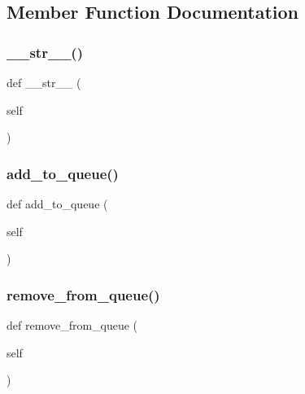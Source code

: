 \subsection{Member Function Documentation}
\mbox{\label{classdynamicfilterapp_1_1models_1_1_item_a23e8041ce1015febe4fdace3225714f9}} 
\subsubsection{\texorpdfstring{\_\_str\_\_()}{\_\_str\_\_()}}
{\footnotesize\ttfamily def \+\_\+\+\_\+str\+\_\+\+\_\+ (\begin{DoxyParamCaption}\item[{}]{self }\end{DoxyParamCaption})}

\mbox{\label{classdynamicfilterapp_1_1models_1_1_item_ac83cd255885b9a7b8852cd66fad6da53}} 
\subsubsection{\texorpdfstring{add\_to\_queue()}{add\_to\_queue()}}
{\footnotesize\ttfamily def add\+\_\+to\+\_\+queue (\begin{DoxyParamCaption}\item[{}]{self }\end{DoxyParamCaption})}

\mbox{\label{classdynamicfilterapp_1_1models_1_1_item_a438b59c52d810e87114f98c1996d6272}} 
\subsubsection{\texorpdfstring{remove\_from\_queue()}{remove\_from\_queue()}}
{\footnotesize\ttfamily def remove\+\_\+from\+\_\+queue (\begin{DoxyParamCaption}\item[{}]{self }\end{DoxyParamCaption})}

\mbox{\label{classdynamicfilterapp_1_1models_1_1_item_a51829b63adb24ac48d350dee60181002}} 

